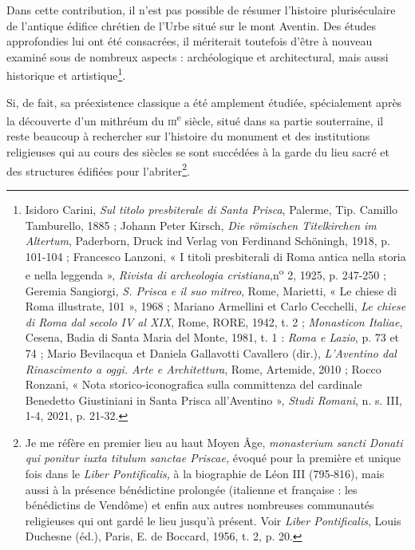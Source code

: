 \documentclass[12pt,twoside,openany]{book}
\begin{document}
Dans cette contribution, il n’est pas possible de résumer l’histoire pluriséculaire de l’antique édifice chrétien de l’Urbe situé sur le mont Aventin. Des études approfondies lui ont été consacrées, il mériterait toutefois d’être à nouveau examiné sous de nombreux aspects : archéologique et architectural, mais aussi historique et artistique\footnote{Isidoro Carini, \textit{Sul titolo presbiterale di Santa Prisca}, Palerme, Tip. Camillo Tamburello, 1885 ; Johann Peter Kirsch, \textit{Die römischen Titelkirchen im Altertum}, Paderborn, Druck ind Verlag von Ferdinand Schöningh, 1918, p. 101-104 ; Francesco Lanzoni, « I titoli presbiterali di Roma antica nella storia e nella leggenda », \textit{Rivista di archeologia cristiana},n\textsuperscript{o} 2, 1925, p. 247-250 ; Geremia Sangiorgi, \textit{S. Prisca e il suo mitreo}, Rome, Marietti, « Le chiese di Roma illustrate, 101 », 1968 ; Mariano Armellini et Carlo Cecchelli, \textit{Le chiese di Roma dal secolo IV al XIX}, Rome, RORE, 1942, t. 2 ; \textit{Monasticon Italiae}, Cesena, Badia di Santa Maria del Monte, 1981, t. 1 : \textit{Roma e Lazio}, p. 73 et 74 ; Mario Bevilacqua et Daniela Gallavotti Cavallero (dir.), \textit{L’Aventino dal Rinascimento a oggi. Arte e Architettura}, Rome, Artemide, 2010 ; Rocco Ronzani, « Nota storico-iconografica sulla committenza del cardinale Benedetto Giustiniani in Santa Prisca all’Aventino », \textit{Studi Romani}, n. s. III, 1-4, 2021, p. 21-32.}.

Si, de fait, sa préexistence classique a été amplement étudiée, spécialement après la découverte d’un mithréum du \textsc{iii}\textsuperscript{e} siècle, situé dans sa partie souterraine, il reste beaucoup à rechercher sur l’histoire du monument et des institutions religieuses qui au cours des siècles se sont succédées à la garde du lieu sacré et des structures édifiées pour l’abriter\footnote{Je me réfère en premier lieu au haut Moyen Âge, \textit{monasterium sancti Donati qui ponitur iuxta titulum sanctae Priscae,} évoqué pour la première et unique fois dans le \textit{Liber Pontificalis,} à la biographie de Léon III (795‑816), mais aussi à la présence bénédictine prolongée (italienne et française : les bénédictins de Vendôme) et enfin aux autres nombreuses communautés religieuses qui ont gardé le lieu jusqu’à présent. Voir \textit{Liber Pontificalis}, Louis Duchesne (éd.), Paris, E. de Boccard, 1956, t. 2, p. 20.}.
\end{document}
